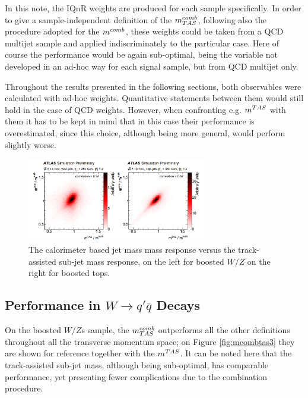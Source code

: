 
In this note, the IQnR weights are produced for each sample specifically. In order to give a sample-independent definition of the $m^{comb}_{TAS}$, following also the procedure adopted for the $m^{comb}$, these weights could be taken from a QCD multijet sample and applied indiscriminately to the particular case. Here of course the performance would be again sub-optimal, being the variable not developed in an ad-hoc way for each signal sample, but from QCD multijet only.

Throughout the results presented in the following sections, both observables were calculated with ad-hoc weights. Quantitative statements between them would still hold in the case of QCD weights. However, when confronting e.g. $\mtas$ with them it has to be kept in mind that in this case their performance is overestimated, since this choice, although being more general, would perform slightly worse.

\begin{figure}[!ht]
  \centering
      \includegraphics[width=0.7\textwidth]{jet_part/mcomb/mcomb2.png}
  \caption[$\mcal$ and $\mtas$ correlation plots]{The calorimeter based jet mass mass response versus the track-assisted sub-jet mass response, on the left for boosted $W/Z$ on the right for boosted tops.}
  \label{fig:mcomb2}
\end{figure}

\subsection{Performance in $W \to q'\bar{q}$ Decays}
On the boosted $W/Z$s sample, the $m^{comb}_{TAS}$ outperforms all the other definitions throughout all the transverse momentum space; on Figure \ref{fig:mcombtas3} they are shown for reference together with the $\mtas$. It can be noted here that the track-assisted sub-jet mass, although being sub-optimal, has comparable performance, yet presenting fewer complications due to the combination procedure.

